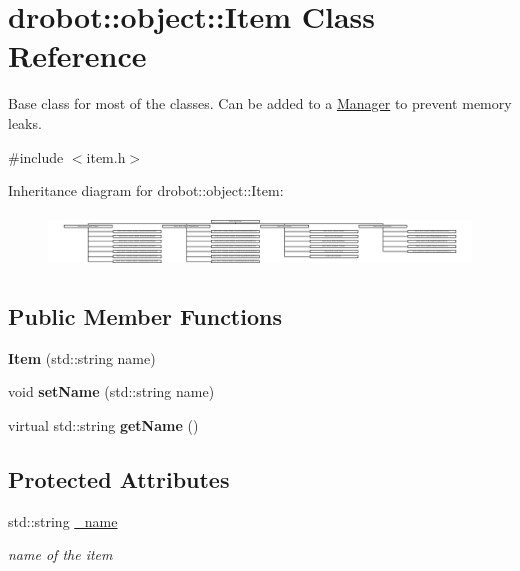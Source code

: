 \hypertarget{classdrobot_1_1object_1_1Item}{\section{drobot\-:\-:object\-:\-:Item Class Reference}
\label{classdrobot_1_1object_1_1Item}
}


Base class for most of the classes. Can be added to a \hyperlink{classdrobot_1_1object_1_1Manager}{Manager} to prevent memory leaks.  




{\ttfamily \#include $<$item.\-h$>$}

Inheritance diagram for drobot\-:\-:object\-:\-:Item\-:\begin{figure}[H]
\begin{center}
\leavevmode
\includegraphics[height=1.412556cm]{classdrobot_1_1object_1_1Item}
\end{center}
\end{figure}
\subsection*{Public Member Functions}
\begin{DoxyCompactItemize}
\item 
\hypertarget{classdrobot_1_1object_1_1Item_acc8d4d20dfcbb135b14eea75f823bffa}{{\bfseries Item} (std\-::string name)}\label{classdrobot_1_1object_1_1Item_acc8d4d20dfcbb135b14eea75f823bffa}

\item 
\hypertarget{classdrobot_1_1object_1_1Item_afe4a17af245f08bbe5b34ff0902bd7e5}{void {\bfseries set\-Name} (std\-::string name)}\label{classdrobot_1_1object_1_1Item_afe4a17af245f08bbe5b34ff0902bd7e5}

\item 
\hypertarget{classdrobot_1_1object_1_1Item_a24d83fed092adae39ea5947454e03b2f}{virtual std\-::string {\bfseries get\-Name} ()}\label{classdrobot_1_1object_1_1Item_a24d83fed092adae39ea5947454e03b2f}

\end{DoxyCompactItemize}
\subsection*{Protected Attributes}
\begin{DoxyCompactItemize}
\item 
\hypertarget{classdrobot_1_1object_1_1Item_a319f13abefdd8e4abb5da064a7227bb2}{std\-::string \hyperlink{classdrobot_1_1object_1_1Item_a319f13abefdd8e4abb5da064a7227bb2}{\-\_\-name}}\label{classdrobot_1_1object_1_1Item_a319f13abefdd8e4abb5da064a7227bb2}

\begin{DoxyCompactList}\small\item\em name of the item \end{DoxyCompactList}\end{DoxyCompactItemize}



